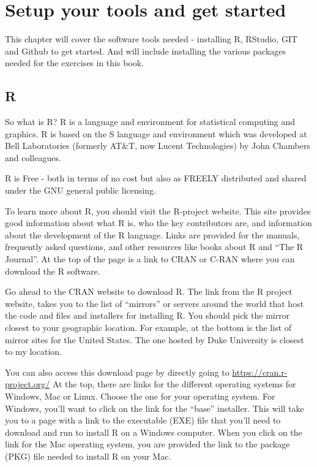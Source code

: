 \documentclass[
]{book}
\begin{document}
\hypertarget{getstarted}{%
\chapter{Setup your tools and get started}\label{getstarted}}

This chapter will cover the software tools needed - installing R, RStudio, GIT and Github to get started. And will include installing the various packages needed for the exercises in this book.

\hypertarget{r}{%
\section{R}\label{r}}

So what is R? R is a language and environment for statistical computing and graphics. R is based on the S language and environment which was developed at Bell Laboratories (formerly AT\&T, now Lucent Technologies) by John Chambers and colleagues.

R is Free - both in terms of no cost but also as FREELY distributed and shared under the GNU general public licensing.

To learn more about R, you should visit the R-project website. This site provides good information about what R is, who the key contributors are, and information about the development of the R language. Links are provided for the manuals, frequently asked questions, and other resources like books about R and ``The R Journal''. At the top of the page is a link to CRAN or C-RAN where you can download the R software.

Go ahead to the CRAN website to download R. The link from the R project website, takes you to the list of ``mirrors'' or servers around the world that host the code and files and installers for installing R. You should pick the mirror closest to your geographic location. For example, at the bottom is the list of mirror sites for the United States. The one hosted by Duke University is closest to my location.

You can also access this download page by directly going to \url{https://cran.r-project.org/} At the top, there are links for the different operating systems for Windows, Mac or Linux. Choose the one for your operating system. For Windows, you'll want to click on the link for the ``base'' installer. This will take you to a page with a link to the executable (EXE) file that you'll need to download and run to install R on a Windows computer. When you click on the link for the Mac operating system, you are provided the link to the package (PKG) file needed to install R on your Mac.
\end{document}
